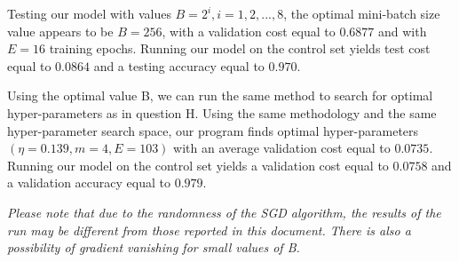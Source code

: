 \documentclass{article}
\begin{document}
Testing our model with values $B=2^{i}, i=1,2,...,8$, the optimal mini-batch size value appears to be $B=256$, with a validation cost equal to $0.6877$ and with $E=16$ training epochs. Running our model on the control set yields test cost equal to $0.0864$ and a testing accuracy equal to $0.970$.

Using the optimal value B, we can run the same method to search for optimal hyper-parameters as in question H. Using the same methodology and the same hyper-parameter search space, our program finds optimal hyper-parameters $(\eta=0.139, m=4, E=103)$ with an average validation cost equal to $0.0735$. Running our model on the control set yields a validation cost equal to $0.0758$ and a validation accuracy equal to $0.979$.

\textit{Please note that due to the randomness of the SGD algorithm, the results of the run may be different from those reported in this document. There is also a possibility of gradient vanishing for small values of B.}	


\printbibliography
\end{document}
